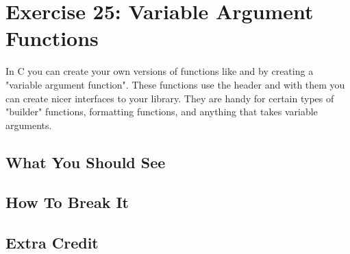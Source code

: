 \chapter{Exercise 25: Variable Argument Functions}

In C you can create your own versions of functions like  and
 by creating a "variable argument function".  These functions use
the header  and with them you can create nicer interfaces to
your library.  They are handy for certain types of "builder" functions,
formatting functions, and anything that takes variable arguments.


\section{What You Should See}


\section{How To Break It}


\section{Extra Credit}



